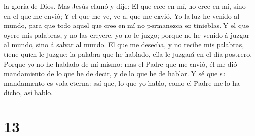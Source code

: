 la gloria de Dios.  Mas Jesús clamó y dijo: El que cree en
mí, no cree en mí, sino en el que me envió;  Y el que me
ve, ve al que me envió.  Yo la luz he venido al mundo, para
que todo aquel que cree en mí no permanezca en tinieblas. 
Y el que oyere mis palabras, y no las creyere, yo no le juzgo; porque no
he venido á juzgar al mundo, sino á salvar al mundo.  El
que me desecha, y no recibe mis palabras, tiene quien le juzgue: la
palabra que he hablado, ella le juzgará en el día postrero.
 Porque yo no he hablado de mí mismo: mas el Padre que me
envió, él me dió mandamiento de lo que he de decir, y de lo que he de
hablar.  Y sé que su mandamiento es vida eterna: así que,
lo que yo hablo, como el Padre me lo ha dicho, así hablo.

\hypertarget{section-12}{%
\section{13}\label{section-12}}

